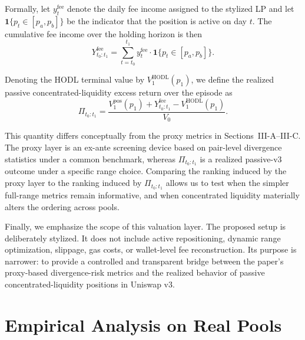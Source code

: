 \documentclass[anonymous]{lipics-v2021}
\begin{document}
{Formally, let $y^{\mathrm{fee}}_t$ denote the daily fee income assigned to the stylized LP and let $\mathbf{1}\{p_t \in [p_a,p_b]\}$ be the indicator that the position is active on day $t$. The cumulative fee income over the holding horizon is then}
\begin{equation}
\label{eq:cum_fee_income}
Y^{\mathrm{fee}}_{t_0:t_1}
=
\sum_{t=t_0}^{t_1}
y^{\mathrm{fee}}_t \cdot \mathbf{1}\{p_t \in [p_a,p_b]\}.
\end{equation}

{Denoting the HODL terminal value by $V^{\mathrm{HODL}}_1(p_1)$, we define the realized passive concentrated-liquidity excess return over the episode as}
\begin{equation}
\label{eq:passive_v3_profit}
\Pi_{t_0:t_1}
=
\frac{V^{\mathrm{pos}}_1(p_1)+Y^{\mathrm{fee}}_{t_0:t_1}-V^{\mathrm{HODL}}_1(p_1)}{V_0}.
\end{equation}

{This quantity differs conceptually from the proxy metrics in Sections~III-A--III-C. The proxy layer is an ex-ante screening device based on pair-level divergence statistics under a common benchmark, whereas $\Pi_{t_0:t_1}$ is a realized passive-v3 outcome under a specific range choice. Comparing the ranking induced by the proxy layer to the ranking induced by $\Pi_{t_0:t_1}$ allows us to test when the simpler full-range metrics remain informative, and when concentrated liquidity materially alters the ordering across pools.}

{Finally, we emphasize the scope of this valuation layer. The proposed setup is deliberately stylized. It does not include active repositioning, dynamic range optimization, slippage, gas costs, or wallet-level fee reconstruction. Its purpose is narrower: to provide a controlled and transparent bridge between the paper’s proxy-based divergence-risk metrics and the realized behavior of passive concentrated-liquidity positions in Uniswap v3.}



\section{Empirical Analysis on Real Pools}
\label{sec:empirical_analysis}
\end{document}
